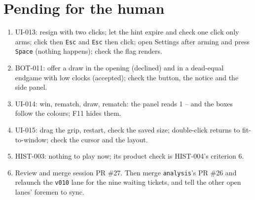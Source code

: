 \documentclass[11pt,a4paper]{article}
\begin{document}
\section*{Pending for the human}

\begin{enumerate}
  \item UI-013: resign with two clicks; let the hint expire and check one click only arms;
        click then \texttt{Esc} and \texttt{Esc} then click; open Settings after arming and press
        \texttt{Space} (nothing happens); check the flag renders.
  \item BOT-011: offer a draw in the opening (declined) and in a dead-equal endgame with low
        clocks (accepted); check the \textonehalf{} button, the notice and the side panel.
  \item UI-014: win, rematch, draw, rematch: the panel reads 1\textonehalf{} -- \textonehalf{}
        and the boxes follow the colours; F11 hides them.
  \item UI-015: drag the grip, restart, check the saved size; double-click returns to
        fit-to-window; check the cursor and the layout.
  \item HIST-003: nothing to play now; its product check is HIST-004's criterion 6.
  \item Review and merge session PR \#27. Then merge \texttt{analysis}'s PR \#26 and relaunch
        the \texttt{v010} lane for the nine waiting tickets, and tell the other open lanes'
        foremen to sync.
\end{enumerate}
\end{document}
